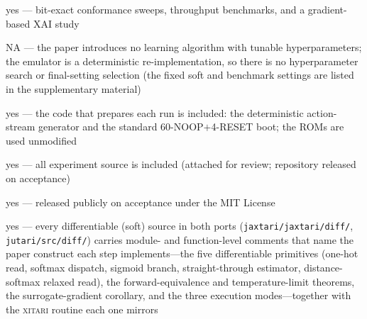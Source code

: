 \documentclass[letterpaper]{article}
\begin{document}
\begin{itemize}

yes --- bit-exact conformance sweeps, throughput benchmarks, and a gradient-based XAI study

\begin{itemize}

	NA --- the paper introduces no learning algorithm with tunable hyperparameters; the emulator is a deterministic re-implementation, so there is no hyperparameter search or final-setting selection (the fixed soft and benchmark settings are listed in the supplementary material)

	yes --- the code that prepares each run is included: the deterministic action-stream generator and the standard 60-NOOP$+$4-RESET boot; the ROMs are used unmodified

	yes --- all experiment source is included (attached for review; repository released on acceptance)

	yes --- released publicly on acceptance under the MIT License
        
	yes --- every differentiable (soft) source in both ports (\texttt{jaxtari/jaxtari/diff/}, \texttt{jutari/src/diff/}) carries module- and function-level comments that name the paper construct each step implements---the five differentiable primitives (one-hot read, softmax dispatch, sigmoid branch, straight-through estimator, distance-softmax relaxed read), the forward-equivalence and temperature-limit theorems, the surrogate-gradient corollary, and the three execution modes---together with the \textsc{xitari} routine each one mirrors


\end{itemize}
\end{itemize}
\end{document}
